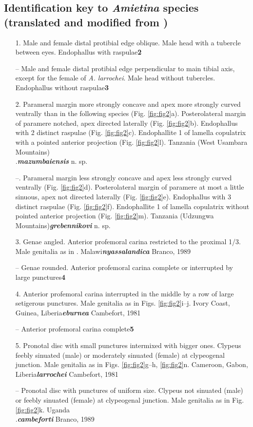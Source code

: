 \documentclass[fleqn,10pt,lineno]{wlpeerj}
\begin{document}
\subsection*{Identification key to \textit{Amietina} species (translated and modified from \cite{branco1988deux})}\hspace*{1pt}
\begin{enumerate}
\item[1.] Male and female distal protibial edge oblique. Male head with a tubercle between eyes. Endophallus with raspulae\dotfill\textbf{2}
\item[--] Male and female distal protibial edge perpendicular to main tibial axis, except for the female of \textit{A. larrochei}. Male head without tubercles. Endophallus without raspulae\dotfill\textbf{3}
\item [2.] Parameral margin more strongly concave and apex more strongly curved ventrally than in the following species (Fig. \ref{fig:fig2}a). Posterolateral margin of paramere notched, apex directed laterally (Fig. \ref{fig:fig2}b). Endophallus with 2 distinct raspulae (Fig. \ref{fig:fig2}c). Endophallite 1 of lamella copulatrix with a pointed anterior projection (Fig. \ref{fig:fig2}l). Tanzania (West Usambara Mountains)\dotfill\\ .\dotfill\textbf{\textit{mazumbaiensis}} n. sp.
\item[--.] Parameral margin less strongly concave and apex less strongly curved ventrally (Fig. \ref{fig:fig2}d). Posterolateral margin of paramere at most a little sinuous, apex not directed laterally (Fig. \ref{fig:fig2}e). Endophallus with 3 distinct raspulae (Fig. \ref{fig:fig2}f). Endophallite 1 of lamella copulatrix without pointed anterior projection (Fig. \ref{fig:fig2}m). Tanzania (Udzungwa Mountains)\dotfill\textbf{\textit{grebennikovi}} n. sp.
\item[3.] Genae angled. Anterior profemoral carina restricted to the proximal 1/3. Male genitalia as in \cite{branco1988deux}. Malawi\dotfill\textbf{\textit{nyassalandica}} Branco, 1989
\item[--] Genae rounded. Anterior profemoral carina complete or interrupted by large punctures\dotfill\textbf{4}
\item[4.] Anterior profemoral carina interrupted in the middle by a row of large setigerous punctures. Male genitalia as in Figs. \ref{fig:fig2}i--j. Ivory Coast, Guinea, Liberia\dotfill\textbf{\textit{eburnea}} Cambefort, 1981
\item[--] Anterior profemoral carina complete\dotfill\textbf{5}
\item[5.] Pronotal disc with small punctures intermixed with bigger ones. Clypeus feebly sinuated (male) or moderately sinuated (female) at clypeogenal junction. Male genitalia as in Figs. \ref{fig:fig2}g--h, \ref{fig:fig2}n. Cameroon, Gabon, Liberia\dotfill\textbf{\textit{larrochei}} Cambefort, 1981
\item[--] Pronotal disc with punctures of uniform size. Clypeus not sinuated (male) or feebly sinuated (female) at clypeogenal junction. Male genitalia as in Fig. \ref{fig:fig2}k. Uganda\dotfill \\ .\dotfill\textbf{\textit{cambeforti}} Branco, 1989
\end{enumerate}
\end{document}
